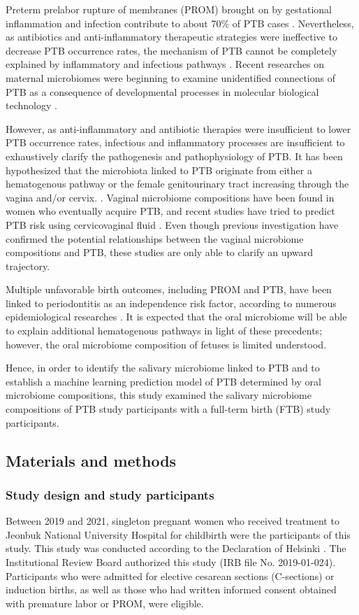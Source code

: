 \documentclass[11pt, a4paper, onecolumn, oneside]{report}
\begin{document}
            Preterm prelabor rupture of membranes (PROM) brought on by gestational inflammation and infection contribute to about 70\% of PTB cases \cite{PTB-prediction-5}. Nevertheless, as antibiotics and anti-inflammatory therapeutic strategies were ineffective to decrease PTB occurrence rates, the mechanism of PTB cannot be completely explained by inflammatory and infectious pathways \cite{PTB-mechanism-1}. Recent researches on maternal microbiomes were beginning to examine unidentified connections of PTB as a consequence of developmental processes in molecular biological technology \cite{PTB-mechanism-2}.

            However, as anti-inflammatory and antibiotic therapies were insufficient to lower PTB occurrence rates, infectious and inflammatory processes are insufficient to exhaustively clarify the pathogenesis and pathophysiology of PTB. It has been hypothesized that the microbiota linked to PTB originate from either a hematogenous pathway or the female genitourinary tract increasing through the vagina and/or cervix. \cite{PTB-mechanism-3}. Vaginal microbiome compositions have been found in women who eventually acquire PTB, and recent studies have tried to predict PTB risk using cervicovaginal fluid \cite{PTB-mechanism-4}. Even though previous investigation have confirmed the potential relationships between the vaginal microbiome compositions and PTB, these studies are only able to clarify an upward trajectory.

            Multiple unfavorable birth outcomes, including PROM and PTB, have been linked to periodontitis as an independence risk factor, according to numerous epidemiological researches \cite{PTB-mechanism-5}. It is expected that the oral microbiome will be able to explain additional hematogenous pathways in light of these precedents; however, the oral microbiome composition of fetuses is limited understood.

            Hence, in order to identify the salivary microbiome linked to PTB and to establish a machine learning prediction model of PTB determined by oral microbiome compositions, this study examined the salivary microbiome compositions of PTB study participants with a full-term birth (FTB) study participants.
        \newpage

        \subsection{Materials and methods}
            \subsubsection{Study design and study participants}
                Between 2019 and 2021, singleton pregnant women who received treatment to Jeonbuk National University Hospital for childbirth were the participants of this study. This study was conducted according to the Declaration of Helsinki \cite{Helsinki-1}. The Institutional Review Board authorized this study (IRB file No. 2019-01-024). Participants who were admitted for elective cesarean sections (C-sections) or induction births, as well as those who had written informed consent obtained with premature labor or PROM, were eligible.
\end{document}

